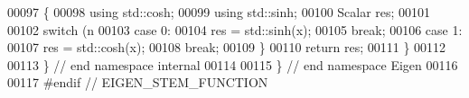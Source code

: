 \begin{DoxyCode}
00097 \{
00098   \textcolor{keyword}{using} std::cosh;
00099   \textcolor{keyword}{using} std::sinh;
00100   Scalar res;
00101   
00102   \textcolor{keywordflow}{switch} (n %
00103   \textcolor{keywordflow}{case} 0:
00104     res = std::sinh(x);
00105     \textcolor{keywordflow}{break};
00106   \textcolor{keywordflow}{case} 1:
00107     res = std::cosh(x);
00108     \textcolor{keywordflow}{break};
00109   \}
00110   \textcolor{keywordflow}{return} res;
00111 \}
00112 
00113 \} \textcolor{comment}{// end namespace internal}
00114 
00115 \} \textcolor{comment}{// end namespace Eigen}
00116 
00117 \textcolor{preprocessor}{#endif // EIGEN\_STEM\_FUNCTION}
\end{DoxyCode}

